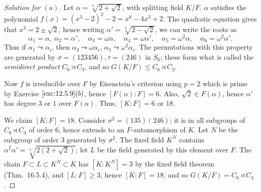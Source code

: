 \documentclass[12pt]{article}
\theoremstyle{remark}
\begin{document}
\begin{proof}[Solution for $(a)$]
  Let $\alpha = \sqrt[3]{2+\sqrt{2}}$, with splitting field $K/F$. $\alpha$ satisfies the polynomial $f(x) = (x^3-2)^2 - 2 = x^6-4x^3+2$. The quadratic equation gives that $x^3 = 2 \pm\sqrt{2}$, hence writing $\alpha' = \sqrt[3]{2-\sqrt{2}}$, we can write the roots as
  \begin{equation*}
    \alpha_1 = \alpha, ~ \alpha_2 = \alpha', \quad \alpha_3 = \omega\alpha, \quad \alpha_4 = \omega\alpha', \quad \alpha_5 = \omega^2\alpha, \quad \alpha_6 = \omega^2\alpha'.
  \end{equation*}
  Thus if $\alpha_1 \leadsto \alpha_i$, then $\alpha_3 \leadsto \omega\alpha_i$, $\alpha_5 \leadsto \omega^2\alpha_i$. The permutations with this property are generated by $\sigma = (123456),\tau = (246)$ in $S_6$; these form what is called the \emph{semidirect product} $C_6 \rtimes C_3$, and so $G(K/F) \leqslant C_6 \rtimes C_3$.
  \par Now $f$ is irreducible over $F$ by Eisenstein's criterion using $p = 2$ which is prime by Exercise $\ref{exc:12.5.9}(b)$, hence $[F(\alpha):F] = 6$. Also, $\sqrt{2} \in F(\alpha)$, hence $\alpha'$ has degree $3$ or $1$ over $F(\alpha)$. Thus, $[K:F] = 6$ or $18$.
  \par We claim $[K:F] = 18$. Consider $\sigma^2 = (135)(246)$; it is in all subgroups of $C_6 \rtimes C_3$ of order $6$, hence extends to an $F$-automorphism of $K$. Let $N$ be the subgroup of order $3$ generated by $\sigma^2$. The fixed field $K^N$ contains $\alpha^2\alpha' = \sqrt[3]{2(2+\sqrt{2})}$; let $L$ be the field generated by this element over $F$. The chain $F \subset L \subset K^N \subset K$ has $[K:K^N] = 3$ by the fixed field theorem (Thm.~16.5.4), and $[L:F] \ge 3$, hence $[K:F] = 18$, and so $G(K/F) = C_6 \rtimes C_3$.
\end{proof}
\end{document}
